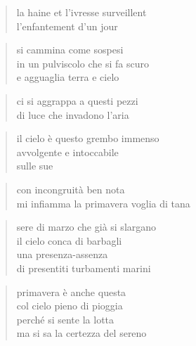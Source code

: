 
\begin{otherlanguage}{french}
    \begin{verse}
        la haine et l’ivresse surveillent\\
        l’enfantement d’un jour
    \end{verse}
\end{otherlanguage}

\clearpage


\begin{verse}
    si cammina come sospesi\\
    in un pulviscolo che si fa scuro\\
    e agguaglia terra e cielo
\end{verse}

\begin{verse}
    ci si aggrappa a questi pezzi\\
    di luce che invadono l’aria
\end{verse}

\clearpage


\begin{verse}
    il cielo è questo grembo immenso\\
    avvolgente e intoccabile\\
    sulle sue
\end{verse}

\begin{verse}
    con incongruità ben nota\\
    mi infiamma la primavera voglia di tana
\end{verse}

\clearpage


\begin{verse}
    sere di marzo che già si slargano\\
    il cielo conca di barbagli\\
    una presenza-assenza\\
    di presentiti turbamenti marini
\end{verse}

\clearpage


\begin{verse}
     primavera è anche questa\\
     col cielo pieno di pioggia\\
     perché si sente la lotta\\
     ma si sa la certezza del sereno
\end{verse}

